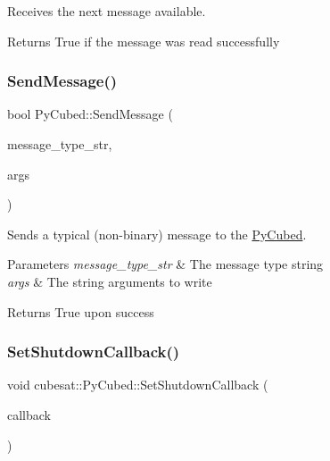 Receives the next message available. 

\begin{DoxyReturn}{Returns}
True if the message was read successfully 
\end{DoxyReturn}
\mbox{\label{classcubesat_1_1PyCubed_a18980909f0eac65f0977be35336a533c}} 
\subsubsection{\texorpdfstring{Send\+Message()}{SendMessage()}}
{\footnotesize\ttfamily bool Py\+Cubed\+::\+Send\+Message (\begin{DoxyParamCaption}\item[{const std\+::string \&}]{message\+\_\+type\+\_\+str,  }\item[{const std\+::vector$<$ std\+::string $>$ \&}]{args }\end{DoxyParamCaption})}



Sends a typical (non-\/binary) message to the \hyperlink{classcubesat_1_1PyCubed}{Py\+Cubed}. 


\begin{DoxyParams}{Parameters}
{\em message\+\_\+type\+\_\+str} & The message type string \\
\hline
{\em args} & The string arguments to write \\
\hline
\end{DoxyParams}
\begin{DoxyReturn}{Returns}
True upon success 
\end{DoxyReturn}
\mbox{\label{classcubesat_1_1PyCubed_acfbc0579ac92c5ef15ccf27f78bbd721}} 
\subsubsection{\texorpdfstring{Set\+Shutdown\+Callback()}{SetShutdownCallback()}}
{\footnotesize\ttfamily void cubesat\+::\+Py\+Cubed\+::\+Set\+Shutdown\+Callback (\begin{DoxyParamCaption}\item[{\hyperlink{namespacecubesat_abcc8eedef699fb7e3f433200cc25e181}{Py\+Cubed\+Shutdown\+Callback}}]{callback }\end{DoxyParamCaption})\hspace{0.3cm}{\ttfamily [inline]}}



